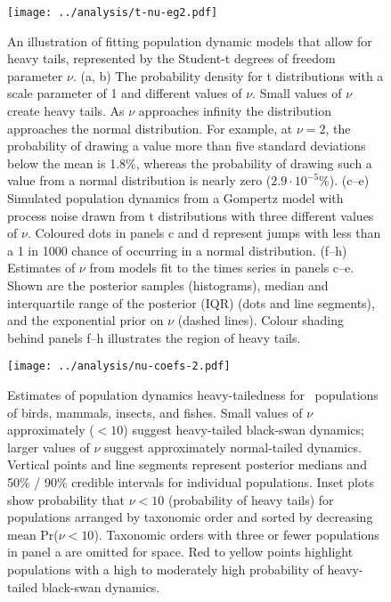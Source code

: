\begin{figure}[htbp]
\begin{center}
\texttt{[image: ../analysis/t-nu-eg2.pdf]}
\caption[An illustration of fitting population dynamic models that allow for heavy
tails, represented by the Student-t degrees of freedom parameter $\nu$.]{
An illustration of fitting population dynamic models that allow for heavy
tails, represented by the Student-t degrees of freedom parameter $\nu$. (a, b)
The probability density for t distributions with a scale parameter of 1 and
different values of $\nu$. Small values of $\nu$ create heavy tails. As $\nu$
approaches infinity the distribution approaches the normal distribution. For
example, at $\nu = 2$, the probability of drawing a value more than five
standard deviations below the mean is 1.8\%, whereas the probability of drawing
such a value from a normal distribution is nearly zero ($2.9\cdot10^{-5}$\%).
(c--e) Simulated population dynamics from a Gompertz model with process noise
drawn from t distributions with three different values of $\nu$. Coloured dots
in panels c and d represent jumps with less than a 1 in 1000 chance of
occurring in a normal distribution. (f--h) Estimates of $\nu$ from models fit
to the times series in panels c--e. Shown are the posterior samples
(histograms), median and interquartile range of the posterior (IQR) (dots and
line segments), and the exponential prior on $\nu$ (dashed lines). Colour
shading behind panels f--h illustrates the region of heavy tails.
}
\label{fig:didactic}
\end{center}
\end{figure}

\clearpage

\begin{figure}[htbp]
\begin{center}
\texttt{[image: ../analysis/nu-coefs-2.pdf]}

\caption[Estimates of population dynamics heavy-tailedness for \nuCoefPopN\
  populations of birds, mammals, insects, and fishes.]{Estimates of population dynamics heavy-tailedness for \nuCoefPopN\
  populations of birds, mammals, insects, and fishes. Small values of $\nu$
  approximately ($< 10$) suggest heavy-tailed black-swan dynamics; larger values of
  $\nu$ suggest approximately normal-tailed dynamics. Vertical points and line
  segments represent posterior medians and 50\% / 90\% credible intervals for
  individual populations. Inset plots show probability that $\nu < 10$
  (probability of heavy tails) for populations arranged by taxonomic order and
  sorted by decreasing mean Pr($\nu < 10$). Taxonomic orders with three or
  fewer populations in panel a are omitted for space. Red to yellow points
  highlight populations with a high to moderately high probability of
  heavy-tailed black-swan dynamics.}

\label{fig:nu-coefs}
\end{center}
\end{figure}
\clearpage

